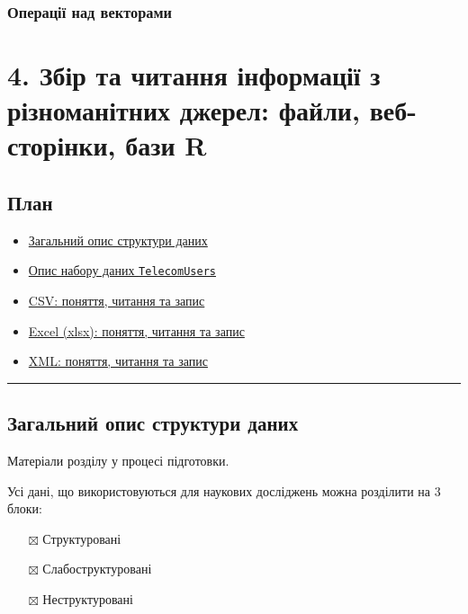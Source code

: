 \documentclass[
]{book}
\providecommand{\tightlist}{%
  \setlength{\itemsep}{0pt}\setlength{\parskip}{0pt}}
\begin{document}
\hypertarget{chapter323}{%
\subsection{Операції над векторами}\label{chapter323}}

\hypertarget{chapter4}{%
\chapter{4. Збір та читання інформації з різноманітних джерел: файли, веб-сторінки, бази R}\label{chapter4}}

\hypertarget{ux43fux43bux430ux43d-3}{%
\section*{План}\label{ux43fux43bux430ux43d-3}}

\begin{itemize}
\tightlist
\item
  \protect\hyperlink{chapter41}{Загальний опис структури даних}
\item
  \protect\hyperlink{chapter42}{Опис набору даних \texttt{TelecomUsers}}
\item
  \protect\hyperlink{chapter43}{CSV: поняття, читання та запис}
\item
  \protect\hyperlink{chapter44}{Excel (xlsx): поняття, читання та запис}
\item
  \protect\hyperlink{chapter45}{XML: поняття, читання та запис}
\end{itemize}

\begin{center}\rule{0.5\linewidth}{0.5pt}\end{center}

\hypertarget{chapter41}{%
\section{Загальний опис структури даних}\label{chapter41}}

Матеріали розділу у процесі підготовки.

Усі дані, що використовуються для наукових досліджень можна розділити на 3 блоки:

\begin{itemize}
\tightlist
\item[$\boxtimes$]
  Структуровані
\item[$\boxtimes$]
  Слабоструктуровані
\item[$\boxtimes$]
  Неструктуровані
\end{itemize}
\end{document}
